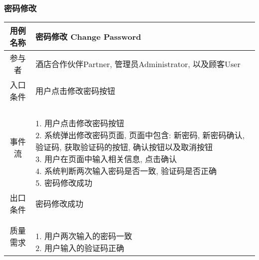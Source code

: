 \documentclass[11pt]{article}
\begin{document}
		\subsubsection{密码修改}
			\begin{tabular}{c|l}
			\hline
			用例名称 & 密码修改 Change Password \\ \hline
			参与者 & 酒店合作伙伴Partner, 管理员Administrator, 以及顾客User  \\ \hline
			入口条件 & 用户点击修改密码按钮 \\ \hline
			事件流 & 	\parbox{33em}{\ \\
						1. 用户点击修改密码按钮 \\
						2. 系统弹出修改密码页面, 页面中包含: 新密码, 新密码确认, 验证码, 获取验证码的按钮, 确认按钮以及取消按钮\\
						3. 用户在页面中输入相关信息, 点击确认  \\
						4. 系统判断两次输入密码是否一致, 验证码是否正确 \\
						5. 密码修改成功 \\
						} \\ \hline
			出口条件 & 密码修改成功 \\ \hline
			质量需求 & \parbox{33em}{\ \\
						1. 用户两次输入的密码一致 \\
						2. 用户输入的验证码正确 \\
						} \\ \hline
			\end{tabular}\\ \\ \\ \\ 
\end{document}
